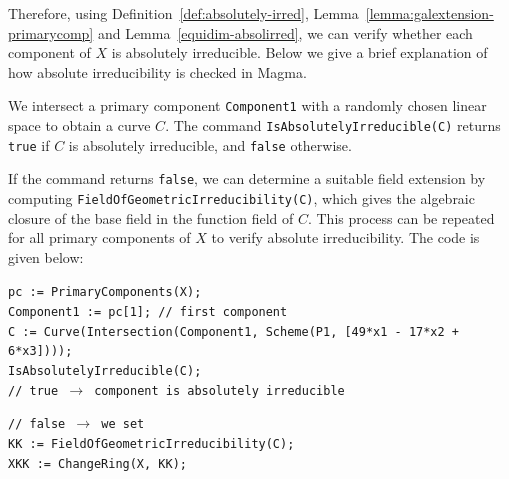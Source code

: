 \documentclass{amsart}
\begin{document}
Therefore, using Definition~\ref{def:absolutely-irred}, Lemma~\ref{lemma:galextension-primarycomp} and Lemma~\ref{equidim-absolirred}, we can verify whether each component of \(X\) is absolutely irreducible. Below we give a brief explanation of how absolute irreducibility is checked in Magma.


We intersect a primary component \texttt{Component1} with a randomly chosen linear space to obtain a curve $C$. The command \texttt{IsAbsolutelyIrreducible(C)} returns \texttt{true} if \(C\) is absolutely irreducible, and \texttt{false} otherwise.

If the command returns \texttt{false}, we can determine a suitable field extension by computing \texttt{FieldOfGeometricIrreducibility(C)}, which gives the algebraic closure of the base field in the function field of \(C\). This process can be repeated for all primary components of $X$ to verify absolute irreducibility. The code is given below:

\begin{flushleft}
\texttt{pc := PrimaryComponents(X);} \\
\texttt{Component1 := pc[1]; // first component} \\
\texttt{C := Curve(Intersection(Component1, Scheme(P1, [49*x1 - 17*x2 + 6*x3])));} \\
\texttt{IsAbsolutelyIrreducible(C);} \\
\texttt{// true  $\rightarrow$ component is absolutely irreducible}
\end{flushleft}

\begin{flushleft}
\texttt{// false $\rightarrow$ we set }\\
\texttt{KK := FieldOfGeometricIrreducibility(C);} \\
\texttt{XKK := ChangeRing(X, KK);} \\
\end{flushleft}
\end{document}
